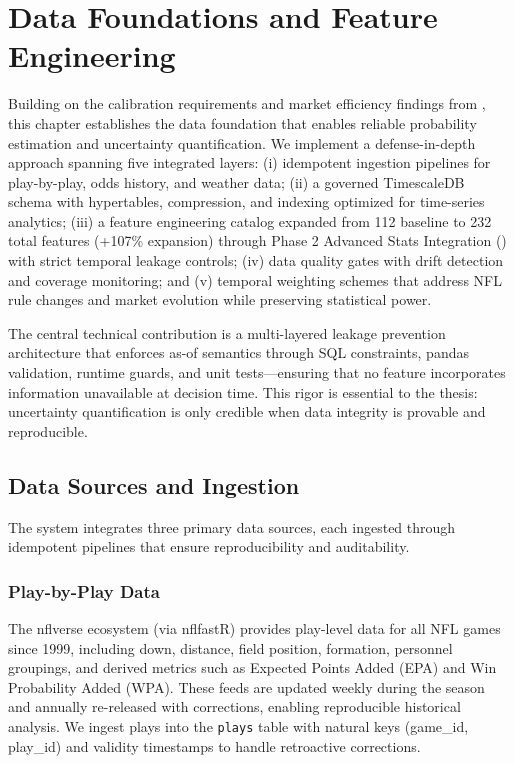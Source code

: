 \chapter{Data Foundations and Feature Engineering}
\label{chap:data}

Building on the calibration requirements and market efficiency findings from , this chapter establishes the data foundation that enables reliable probability estimation and uncertainty quantification. We implement a defense-in-depth approach spanning five integrated layers: (i) idempotent ingestion pipelines for play-by-play, odds history, and weather data; (ii) a governed TimescaleDB schema with hypertables, compression, and indexing optimized for time-series analytics; (iii) a feature engineering catalog expanded from 112 baseline to 232 total features (+107\% expansion) through Phase 2 Advanced Stats Integration () with strict temporal leakage controls; (iv) data quality gates with drift detection and coverage monitoring; and (v) temporal weighting schemes that address NFL rule changes and market evolution while preserving statistical power.

The central technical contribution is a multi-layered leakage prevention architecture that enforces as-of semantics through SQL constraints, pandas validation, runtime guards, and unit tests---ensuring that no feature incorporates information unavailable at decision time. This rigor is essential to the thesis: uncertainty quantification is only credible when data integrity is provable and reproducible.



\section{Data Sources and Ingestion}
\label{sec:ingestion}

The system integrates three primary data sources, each ingested through idempotent pipelines that ensure reproducibility and auditability.

\subsection{Play-by-Play Data}
The nflverse ecosystem (via nflfastR) provides play-level data for all NFL games since 1999, including down, distance, field position, formation, personnel groupings, and derived metrics such as Expected Points Added (EPA) and Win Probability Added (WPA). These feeds are updated weekly during the season and annually re-released with corrections, enabling reproducible historical analysis. We ingest plays into the \texttt{plays} table with natural keys (game\_id, play\_id) and validity timestamps to handle retroactive corrections.

